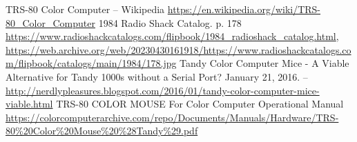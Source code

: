 \documentclass[11pt, a4paper]{article}
\begin{document}
\begin{thebibliography}{9}
 TRS-80 Color Computer -- Wikipedia \url{https://en.wikipedia.org/wiki/TRS-80_Color_Computer}
 1984 Radio Shack Catalog. p. 178 \url{https://www.radioshackcatalogs.com/flipbook/1984_radioshack_catalog.html}, \url{https://web.archive.org/web/20230430161918/https://www.radioshackcatalogs.com/flipbook/catalogs/main/1984/178.jpg}
 Tandy Color Computer Mice - A Viable Alternative for Tandy 1000s without a Serial Port? January 21, 2016. -- \url{http://nerdlypleasures.blogspot.com/2016/01/tandy-color-computer-mice-viable.html}
 TRS-80 COLOR MOUSE For Color Computer Operational Manual \url{https://colorcomputerarchive.com/repo/Documents/Manuals/Hardware/TRS-80%20Color%20Mouse%20%28Tandy%29.pdf}
\end{thebibliography}
\end{document}
